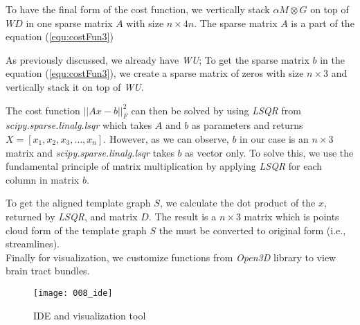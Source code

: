 \documentclass[../structure.tex]{subfiles}
\begin{document}
To have the final form of the cost function, we vertically stack $\alpha M \otimes G$ on top of $WD$ in one sparse matrix $A$ with size $n\times 4n$.  The sparse matrix $A$ is a part of the equation (\ref{equ:costFun3})

As previously discussed, we already have \textit{WU}; To get the sparse matrix $b$ in the equation (\ref{equ:costFun3}), we create a sparse matrix of zeros with size $n\times 3$ and vertically stack it on top of \textit{WU}.

The cost function $||Ax-b||_{F}^2$ can then be solved by using \textit{LSQR} from \textit{scipy.sparse.linalg.lsqr} which takes $A$ and $b$ as parameters and returns $X=[x_{1}, x_{2}, x_{3}, \dots, x_{n}]$. However, as we can observe, $b$ in our case is an $n\times 3$ matrix and \textit{scipy.sparse.linalg.lsqr} takes $b$ as vector only. To solve this, we use the fundamental principle of matrix multiplication by applying \textit{LSQR} for each column in matrix $b$.

To get the aligned template graph $S$, we calculate the dot product of the $x$, returned by \textit{LSQR}, and matrix $D$. The result is a $n\times 3$ matrix which is points cloud form of the template graph $S$ the must be converted to original form (i.e., streamlines).\\



Finally for visualization, we customize functions from \textit{Open3D} library to view brain tract bundles.


\begin{figure}[h!]
\centering
\texttt{[image: 008\_ide]}
\captionsetup{justification=centering}
\caption{IDE and visualization tool}
\end{figure}
\end{document}
